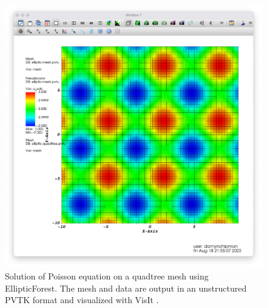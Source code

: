\begin{figure}
    \centering
    \includegraphics[width=\textwidth, clip=true, trim={0 0 0 0}]{figures/sine_cosine_output.png}
    \caption{Solution of Poisson equation on a quadtree mesh using EllipticForest. The mesh and data are output in an unstructured PVTK format and visualized with VisIt \citep{HPV:VisIt}.}
    \label{fig:poisson_solution}
\end{figure}